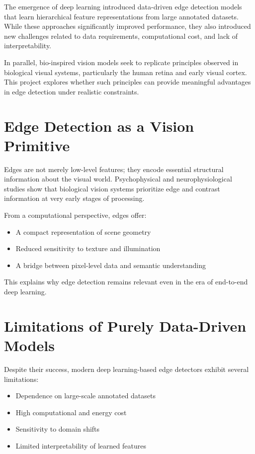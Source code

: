 \documentclass[12pt]{article}
\begin{document}
The emergence of deep learning introduced data-driven edge detection models that
learn hierarchical feature representations from large annotated datasets. While
these approaches significantly improved performance, they also introduced new
challenges related to data requirements, computational cost, and lack of
interpretability.

In parallel, bio-inspired vision models seek to replicate principles observed in
biological visual systems, particularly the human retina and early visual cortex.
This project explores whether such principles can provide meaningful advantages in
edge detection under realistic constraints.

\section{Edge Detection as a Vision Primitive}

Edges are not merely low-level features; they encode essential structural
information about the visual world. Psychophysical and neurophysiological studies
show that biological vision systems prioritize edge and contrast information at
very early stages of processing.

From a computational perspective, edges offer:
\begin{itemize}
\item A compact representation of scene geometry
\item Reduced sensitivity to texture and illumination
\item A bridge between pixel-level data and semantic understanding
\end{itemize}

This explains why edge detection remains relevant even in the era of end-to-end
deep learning.

\section{Limitations of Purely Data-Driven Models}

Despite their success, modern deep learning-based edge detectors exhibit several
limitations:
\begin{itemize}
\item Dependence on large-scale annotated datasets
\item High computational and energy cost
\item Sensitivity to domain shifts
\item Limited interpretability of learned features
\end{itemize}
\end{document}
